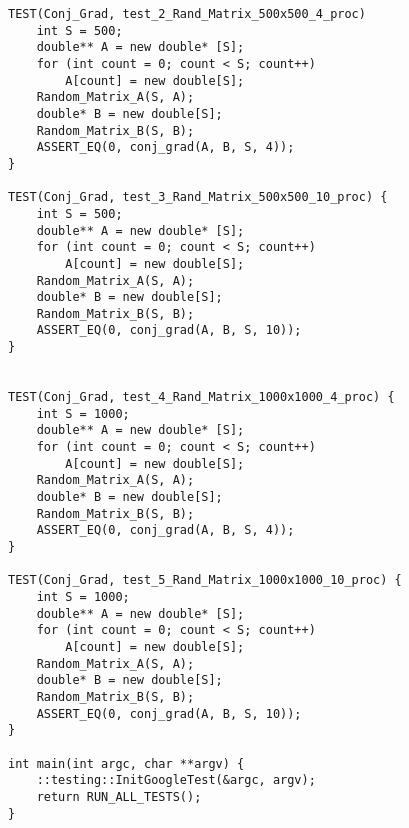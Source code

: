 \documentclass{report}
\begin{document}
\begin{lstlisting}
TEST(Conj_Grad, test_2_Rand_Matrix_500x500_4_proc) 
    int S = 500;
    double** A = new double* [S];
    for (int count = 0; count < S; count++)
        A[count] = new double[S];
    Random_Matrix_A(S, A);
    double* B = new double[S];
    Random_Matrix_B(S, B);
    ASSERT_EQ(0, conj_grad(A, B, S, 4));
}

TEST(Conj_Grad, test_3_Rand_Matrix_500x500_10_proc) {
    int S = 500;
    double** A = new double* [S];
    for (int count = 0; count < S; count++)
        A[count] = new double[S];
    Random_Matrix_A(S, A);
    double* B = new double[S];
    Random_Matrix_B(S, B);
    ASSERT_EQ(0, conj_grad(A, B, S, 10));
}


TEST(Conj_Grad, test_4_Rand_Matrix_1000x1000_4_proc) {
    int S = 1000;
    double** A = new double* [S];
    for (int count = 0; count < S; count++)
        A[count] = new double[S];
    Random_Matrix_A(S, A);
    double* B = new double[S];
    Random_Matrix_B(S, B);
    ASSERT_EQ(0, conj_grad(A, B, S, 4));
}

TEST(Conj_Grad, test_5_Rand_Matrix_1000x1000_10_proc) {
    int S = 1000;
    double** A = new double* [S];
    for (int count = 0; count < S; count++)
        A[count] = new double[S];
    Random_Matrix_A(S, A);
    double* B = new double[S];
    Random_Matrix_B(S, B);
    ASSERT_EQ(0, conj_grad(A, B, S, 10));
}

int main(int argc, char **argv) {
    ::testing::InitGoogleTest(&argc, argv);
    return RUN_ALL_TESTS();
}
\end{lstlisting}
\end{document}
